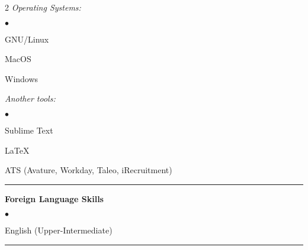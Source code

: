 \documentclass[oneside,final,12pt]{extreport}
\newenvironment{compactlist}{
	\begin{list}{{$\bullet$}}{
		\setlength\leftmargin{0.4cm}
		\setlength\partopsep{0pt}
		\setlength\parskip{0pt}
		\setlength\parsep{0pt}
		\setlength\topsep{0pt}
		\setlength\itemsep{0pt}
	}
}{
	\end{list}
}
\begin{document}
\begin{multicols}{2}
\textsl{Operating Systems:}
	\begin{compactlist}
		\item GNU/Linux
		\item MacOS
		\item Windows
	\end{compactlist}
\textsl{Another tools:}
	\begin{compactlist}
		\item Sublime Text
		\item LaTeX
		\item ATS (Avature, Workday, Taleo, iRecruitment)
	\end{compactlist}
\end{multicols}
\rule{\textwidth}{0.4pt}

\bfseries
Foreign Language Skills
\mdseries
\begin{compactlist}
	\item English (Upper-Intermediate)
\end{compactlist}
\rule{\textwidth}{0.4pt}
\end{document}
